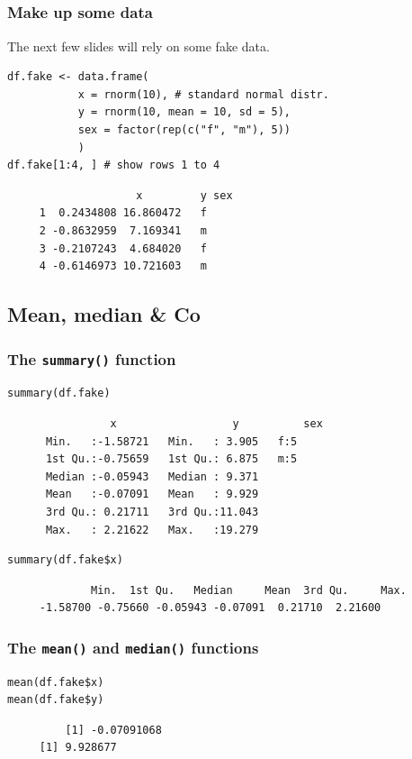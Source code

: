 \documentclass[bigger]{beamer}
\begin{document}
\subsection{}
\begin{frame}[fragile]
\frametitle{Make up some data}
\label{sec-5-1-1}

    The next few slides will rely on some fake data. 

\lstset{language=R}
\begin{lstlisting}
df.fake <- data.frame(
           x = rnorm(10), # standard normal distr.
           y = rnorm(10, mean = 10, sd = 5),
           sex = factor(rep(c("f", "m"), 5))
           )
df.fake[1:4, ] # show rows 1 to 4
\end{lstlisting}

\begin{verbatim}
                    x         y sex
     1  0.2434808 16.860472   f
     2 -0.8632959  7.169341   m
     3 -0.2107243  4.684020   f
     4 -0.6146973 10.721603   m
\end{verbatim}
\end{frame}
\subsection{Mean, median \& Co}
\label{sec-5-2}
\begin{frame}[fragile,shrink=5]
\frametitle{The \texttt{summary()} function}
\label{sec-5-2-1}


\lstset{language=R}
\begin{lstlisting}
summary(df.fake)
\end{lstlisting}

\begin{verbatim}
                x                  y          sex  
      Min.   :-1.58721   Min.   : 3.905   f:5  
      1st Qu.:-0.75659   1st Qu.: 6.875   m:5  
      Median :-0.05943   Median : 9.371        
      Mean   :-0.07091   Mean   : 9.929        
      3rd Qu.: 0.21711   3rd Qu.:11.043        
      Max.   : 2.21622   Max.   :19.279
\end{verbatim}


\lstset{language=R}
\begin{lstlisting}
summary(df.fake$x)
\end{lstlisting}

\begin{verbatim}
             Min.  1st Qu.   Median     Mean  3rd Qu.     Max. 
     -1.58700 -0.75660 -0.05943 -0.07091  0.21710  2.21600
\end{verbatim}
\end{frame}
\begin{frame}[fragile]
\frametitle{The \texttt{mean()} and \texttt{median()} functions}
\label{sec-5-2-2}


\lstset{language=R}
\begin{lstlisting}
mean(df.fake$x)
mean(df.fake$y)
\end{lstlisting}

\begin{verbatim}
         [1] -0.07091068
     [1] 9.928677
\end{verbatim}
\end{frame}
\end{document}
